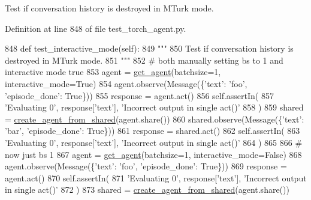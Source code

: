 \begin{DoxyVerb}Test if conversation history is destroyed in MTurk mode.
\end{DoxyVerb}
 

Definition at line 848 of file test\+\_\+torch\+\_\+agent.\+py.


\begin{DoxyCode}
848     \textcolor{keyword}{def }test\_interactive\_mode(self):
849         \textcolor{stringliteral}{"""}
850 \textcolor{stringliteral}{        Test if conversation history is destroyed in MTurk mode.}
851 \textcolor{stringliteral}{        """}
852         \textcolor{comment}{# both manually setting bs to 1 and interactive mode true}
853         agent = \hyperlink{namespacetests_1_1test__torch__agent_ae929d109305aaea29fbfa13ecf1f32e9}{get\_agent}(batchsize=1, interactive\_mode=\textcolor{keyword}{True})
854         agent.observe(Message(\{\textcolor{stringliteral}{'text'}: \textcolor{stringliteral}{'foo'}, \textcolor{stringliteral}{'episode\_done'}: \textcolor{keyword}{True}\}))
855         response = agent.act()
856         self.assertIn(
857             \textcolor{stringliteral}{'Evaluating 0'}, response[\textcolor{stringliteral}{'text'}], \textcolor{stringliteral}{'Incorrect output in single act()'}
858         )
859         shared = \hyperlink{namespaceparlai_1_1core_1_1agents_aa5af5dd1d2f9da491b60348d479b849f}{create\_agent\_from\_shared}(agent.share())
860         shared.observe(Message(\{\textcolor{stringliteral}{'text'}: \textcolor{stringliteral}{'bar'}, \textcolor{stringliteral}{'episode\_done'}: \textcolor{keyword}{True}\}))
861         response = shared.act()
862         self.assertIn(
863             \textcolor{stringliteral}{'Evaluating 0'}, response[\textcolor{stringliteral}{'text'}], \textcolor{stringliteral}{'Incorrect output in single act()'}
864         )
865 
866         \textcolor{comment}{# now just bs 1}
867         agent = \hyperlink{namespacetests_1_1test__torch__agent_ae929d109305aaea29fbfa13ecf1f32e9}{get\_agent}(batchsize=1, interactive\_mode=\textcolor{keyword}{False})
868         agent.observe(Message(\{\textcolor{stringliteral}{'text'}: \textcolor{stringliteral}{'foo'}, \textcolor{stringliteral}{'episode\_done'}: \textcolor{keyword}{True}\}))
869         response = agent.act()
870         self.assertIn(
871             \textcolor{stringliteral}{'Evaluating 0'}, response[\textcolor{stringliteral}{'text'}], \textcolor{stringliteral}{'Incorrect output in single act()'}
872         )
873         shared = \hyperlink{namespaceparlai_1_1core_1_1agents_aa5af5dd1d2f9da491b60348d479b849f}{create\_agent\_from\_shared}(agent.share())

\end{DoxyCode}
